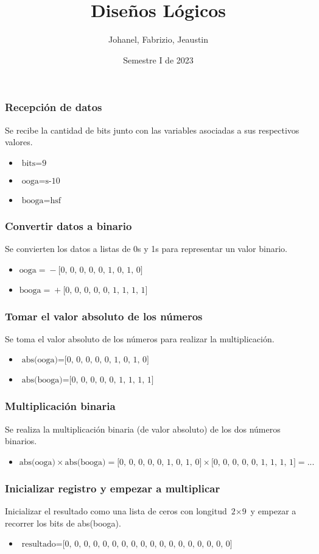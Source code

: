 \documentclass{beamer}
\title{Diseños Lógicos}
\author{Johanel, Fabrizio, Jeaustin}
\institute{Tecnológico de Costa Rica}
\date{Semestre I de 2023}
\begin{document}
\begin{frame}
\frametitle{Recepción de datos}
Se recibe la cantidad de bits junto con las variables asociadas a sus respectivos valores.
\begin{itemize}
\item $\text{bits}=\text{9}$
\item $\text{ooga}=\text{s-10}$
\item $\text{booga}=\text{hsf}$
\end{itemize}
\end{frame}
\begin{frame}
\frametitle{Convertir datos a binario}
Se convierten los datos a listas de 0s y 1s para representar un valor binario.
\begin{itemize}
\item $\text{ooga}=\text{}-\text{[0, 0, 0, 0, 0, 1, 0, 1, 0]}$
\item $\text{booga}=\text{}+\text{[0, 0, 0, 0, 0, 1, 1, 1, 1]}$
\end{itemize}
\end{frame}
\begin{frame}
\frametitle{Tomar el valor absoluto de los números}
Se toma el valor absoluto de los números para realizar la multiplicación.
\begin{itemize}
\item $\text{abs(ooga)}=\text{[0, 0, 0, 0, 0, 1, 0, 1, 0]}$
\item $\text{abs(booga)}=\text{[0, 0, 0, 0, 0, 1, 1, 1, 1]}$
\end{itemize}
\end{frame}
\begin{frame}
\frametitle{Multiplicación binaria}
Se realiza la multiplicación binaria (de valor absoluto) de los dos números binarios.
\begin{itemize}
\item $\text{abs(ooga)}\times\text{abs(booga)}=\text{[0, 0, 0, 0, 0, 1, 0, 1, 0]}\times\text{[0, 0, 0, 0, 0, 1, 1, 1, 1]}=\text{...}$
\end{itemize}
\end{frame}
\begin{frame}
\frametitle{Inicializar registro y empezar a multiplicar}
Inicializar el resultado como una lista de ceros con longitud $\text{2}\times\text{9}$ y empezar a recorrer los bits de abs(booga).
\begin{itemize}
\item $\text{resultado}=\text{[0, 0, 0, 0, 0, 0, 0, 0, 0, 0, 0, 0, 0, 0, 0, 0, 0, 0]}$
\end{itemize}
\end{frame}
\end{document}
